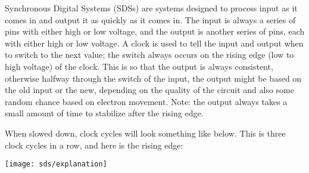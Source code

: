 \begin{blocksection}
Synchronous Digital Systems (SDSs) are systems designed to process input as it comes in and output it as quickly as it comes in.  The input is always a series of pins with either high or low voltage, and the output is another series of pins, each with either high or low voltage.  A clock is used to tell the input and output when to switch to the next value; the switch always occurs on the rising edge (low to high voltage) of the clock.  This is so that the output is always consistent, otherwise halfway through the switch of the input, the output might be based on the old input or the new, depending on the quality of the circuit and also some random chance based on electron movement.  Note: the output always takes a small amount of time to stabilize after the rising edge.

When slowed down, clock cycles will look something like below.  This is three clock cycles in a row, and here is the rising edge:

\texttt{[image: sds/explanation]}

\end{blocksection}